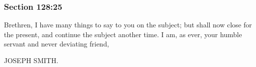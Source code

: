	\subsubsection{Section 128:25} %
		\label{DC128-25}

		Brethren, I have many things to say to you on the subject; but shall now close for the present, and continue the subject another time. I am, as ever, your humble servant and never deviating friend,
		
		JOSEPH SMITH.

